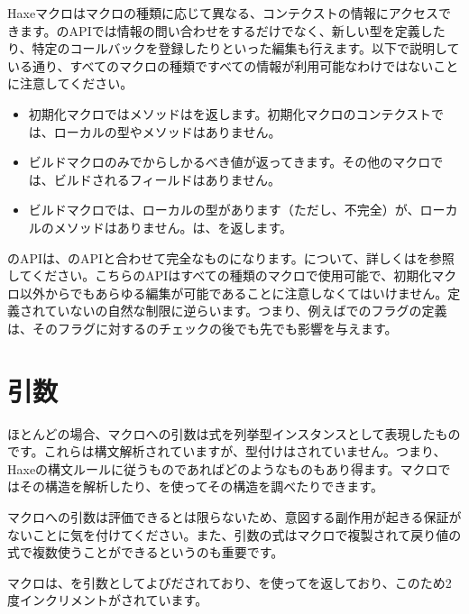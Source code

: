Haxeマクロはマクロの種類に応じて異なる、コンテクストの情報にアクセスできます。のAPIでは情報の問い合わせをするだけでなく、新しい型を定義したり、特定のコールバックを登録したりといった編集も行えます。以下で説明している通り、すべてのマクロの種類ですべての情報が利用可能なわけではないことに注意してください。

\begin{itemize}
	\item 初期化マクロではメソッドはを返します。初期化マクロのコンテクストでは、ローカルの型やメソッドはありません。
	\item ビルドマクロのみでからしかるべき値が返ってきます。その他のマクロでは、ビルドされるフィールドはありません。
	\item ビルドマクロでは、ローカルの型があります（ただし、不完全）が、ローカルのメソッドはありません。は、を返します。
\end{itemize}

のAPIは、のAPIと合わせて完全なものになります。について、詳しくはを参照してください。こちらのAPIはすべての種類のマクロで使用可能で、初期化マクロ以外からでもあらゆる編集が可能であることに注意しなくてはいけません。定義されていないの自然な制限に逆らいます。つまり、例えばでのフラグの定義は、そのフラグに対するのチェックの後でも先でも影響を与えます。

\section{引数}
\label{macro-arguments}

ほとんどの場合、マクロへの引数は式を列挙型インスタンスとして表現したものです。これらは構文解析されていますが、型付けはされていません。つまり、Haxeの構文ルールに従うものであればどのようなものもあり得ます。マクロではその構造を解析したり、を使ってその構造を調べたりできます。

マクロへの引数は評価できるとは限らないため、意図する副作用が起きる保証がないことに気を付けてください。また、引数の式はマクロで複製されて戻り値の式で複数使うことができるというのも重要です。


マクロは、を引数としてよびだされており、を使ってを返しており、このため2度インクリメントがされています。

